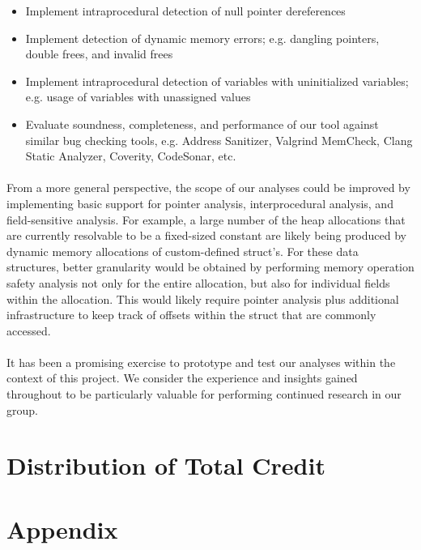 \documentclass[letterpaper,11pt]{article}
\begin{document}
\begin{itemize}
  \item Implement intraprocedural detection of null pointer dereferences
  \item  Implement detection of dynamic memory errors; e.g. dangling pointers,
double frees, and invalid frees
\item Implement intraprocedural detection of variables with uninitialized
variables; e.g. usage of variables with unassigned values
\item Evaluate soundness, completeness, and performance of our tool
  against similar bug checking tools, e.g. Address Sanitizer, Valgrind
  MemCheck, Clang Static Analyzer, Coverity, CodeSonar, etc.
\end{itemize}

\paragraph{}
From a more general perspective, the scope of our analyses could be improved by
implementing basic support for pointer analysis, interprocedural analysis, and
field-sensitive analysis. For example, a large number of the heap allocations
that are currently resolvable to be a fixed-sized constant are likely being
produced by dynamic memory allocations of custom-defined struct’s. For these
data structures, better granularity would be obtained by performing memory
operation safety analysis not only for the entire allocation, but also for
individual fields within the allocation. This would likely require pointer
analysis plus additional infrastructure to keep track of offsets within the
struct that are commonly accessed.

\paragraph{}
It has been a promising exercise to prototype and test our
analyses within the context of this project. We consider the experience and
insights gained throughout to be particularly valuable for performing continued
research in our group.

\section{Distribution of Total Credit}

\clearpage

\appendix
\section{Appendix}
\label{appa1}
\end{document}
